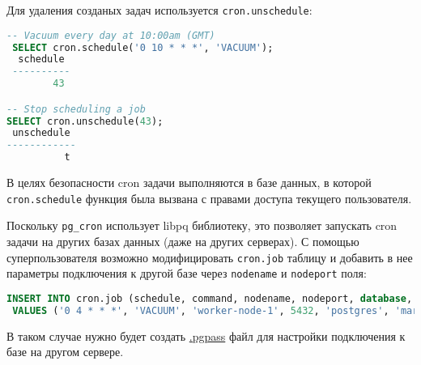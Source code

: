 Для удаления созданых задач используется \lstinline!cron.unschedule!:

\begin{lstlisting}[language=SQL,label=lst:pgcron4,caption=Cron.unschedule]
 -- Vacuum every day at 10:00am (GMT)
 SELECT cron.schedule('0 10 * * *', 'VACUUM');
  schedule
 ----------
        43

-- Stop scheduling a job
SELECT cron.unschedule(43);
 unschedule
------------
          t
\end{lstlisting}

В целях безопасности cron задачи выполняются в базе данных, в которой \lstinline!cron.schedule! функция была вызвана с правами доступа текущего пользователя.

Поскольку \lstinline!pg_cron! использует libpq библиотеку, это позволяет запускать cron задачи на других базах данных (даже на других серверах). С помощью суперпользователя возможно модифицировать \lstinline!cron.job! таблицу и добавить в нее параметры подключения к другой базе через \lstinline!nodename! и \lstinline!nodeport! поля:

\begin{lstlisting}[language=SQL,label=lst:pgcron5,caption=Cron.job]
INSERT INTO cron.job (schedule, command, nodename, nodeport, database, username)
 VALUES ('0 4 * * *', 'VACUUM', 'worker-node-1', 5432, 'postgres', 'marco');
\end{lstlisting}

В таком случае нужно будет создать \href{https://www.postgresql.org/docs/current/static/libpq-pgpass.html}{.pgpass} файл для настройки подключения к базе на другом сервере.
